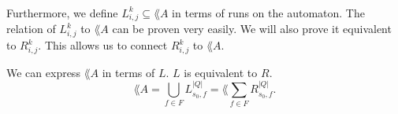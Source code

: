                                 \paragraph{}
                                Furthermore, we define $L^k_{i,j} \subseteq \lang{A}$ in terms of runs on the automaton. 
                                The relation of $L^k_{i,j}$ to $\lang{A}$ can be proven very easily.
                                We will also prove it equivalent to $R^k_{i,j}$.
                                This allows us to connect $R^k_{i,j}$ to $\lang{A}$.
                                \vspace{-0.3cm} 

                                \begin{theorem} We can express $\lang{A}$ in terms of $L$. $L$ is equivalent to $R$.
                                    \label{LR}
                                    \begin{equation*}                          \lang{A} = \bigcup\limits_{f \in F} L^{|Q|}_{s_0, f} = \lang{\sum\limits_{f \in F} R^{|Q|}_{s_0, f}}.                            \end{equation*}
                                    \end{theorem}


